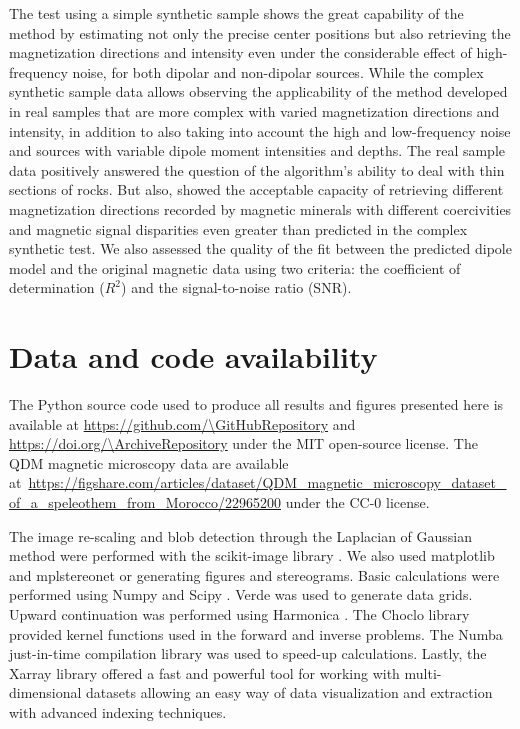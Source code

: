 The test using a simple synthetic sample shows the great capability of the method by estimating not only the precise center positions but also retrieving the magnetization directions and intensity even under the considerable effect of high-frequency noise, for both dipolar and non-dipolar sources.
While the complex synthetic sample data allows observing the applicability of the method developed in real samples that are more complex with varied magnetization directions and intensity, in addition to also taking into account the high and low-frequency noise and sources with variable dipole moment intensities and depths.
The real sample data positively answered the question of the algorithm's ability to deal with thin sections of rocks.
But also, showed the acceptable capacity of retrieving different magnetization directions recorded by magnetic minerals with different coercivities and magnetic signal disparities even greater than predicted in the complex synthetic test.
We also assessed the quality of the fit between the predicted dipole model and the original magnetic data using two criteria: the coefficient of determination ($R^2$) and the signal-to-noise ratio (SNR).

\section{Data and code availability}

The Python source code used to produce all results and figures presented here
is available at \url{https://github.com/\GitHubRepository} and
\url{https://doi.org/\ArchiveRepository} under the MIT open-source license.
The QDM magnetic microscopy data are available at~\url{https://figshare.com/articles/dataset/QDM_magnetic_microscopy_dataset_of_a_speleothem_from_Morocco/22965200} under the CC-0 license.

The image re-scaling and blob detection through the Laplacian of Gaussian
method were performed with the scikit-image library \citep{VanderWalt2014}.
We also used matplotlib \citep{Hunter2007} and mplstereonet \citep{mplstereonet}
or generating figures and stereograms.
Basic calculations were performed using Numpy \citep{Harris2020} and Scipy
\citep{2020SciPy-NMeth}.
Verde \citep{verde2018} was used to generate data grids.
Upward continuation was performed using Harmonica \citep{harmonica2020}.
The Choclo library \citep{choclo2022} provided kernel functions used in the
forward and inverse problems.
The Numba just-in-time compilation library \citep{lam2015numba} was used to
speed-up calculations.
Lastly, the Xarray library \citep{hoyer2017xarray} offered a fast and powerful
tool for working with multi-dimensional datasets allowing an easy way of data
visualization and extraction with advanced indexing techniques.



